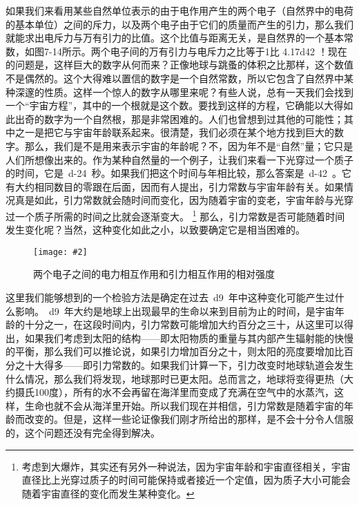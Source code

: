 \documentclass[12pt,oneside]{book}
\providecommand{\numb}[1]{{~\num{#1}~}}
\newenvironment{linefig}[2][1]
{\begin{figure}[H]
\centering
\texttt{[image: \#2]}}
{\end{figure}}
\begin{document}
如果我们来看用某些自然单位表示的由于电作用产生的两个电子（自然界中的电荷的基本单位）之间的斥力，以及两个电子由于它们的质量而产生的引力，那么我们就能求出电斥力与万有引力的比值。这个比值与距离无关，是自然界的一个基本常数，如图7-14所示。两个电子间的万有引力与电斥力之比等于1比 \num{4.17d42} ！现在的问题是，这样巨大的数字从何而来？正像地球与跳蚤的体积之比那样，这个数值不是偶然的。这个大得难以置信的数字是一个自然常数，所以它包含了自然界中某种深邃的性质。这样一个惊人的数字从哪里来呢？有些人说，总有一天我们会找到一个“宇宙方程”，其中的一个根就是这个数。要找到这样的方程，它确能以大得如此出奇的数字为一个自然根，那是非常困难的。人们也曾想到过其他的可能性；其中之一是把它与宇宙年龄联系起来。很清楚，我们必须在某个地方找到巨大的数字。那么，我们是不是用来表示宇宙的年龄呢？不，因为年不是“自然”量；它只是人们所想像出来的。作为某种自然量的一个例子，让我们来看一下光穿过一个质子的时间，它是\numb{d-24}秒。如果我们把这个时间与\uwave{宇宙年龄}\numb{2d10}年相比较，那么答案是\numb{d-42}。它有大约相同数目的零跟在后面，因而有人提出，引力常数与宇宙年龄有关。如果情况真是如此，引力常数就会随时间而变化，因为随着宇宙的变老，宇宙年龄与光穿过一个质子所需的时间之比就会逐渐变大。
\footnote{考虑到大爆炸，其实还有另外一种说法，因为宇宙年龄和宇宙直径相关，宇宙直径比上光穿过质子的时间可能保持或者接近一个定值，因为质子大小可能会随着宇宙直径的变化而发生某种变化。}
那么，引力常数是否可能随着时间发生变化呢？当然，这种变化如此之小，以致要确定它是相当困难的。
\begin{linefig}{两个电子之间的电力相互作用和引力相互作用的相对强度}
\caption{两个电子之间的电力相互作用和引力相互作用的相对强度}
\label{fig:两个电子之间的电力相互作用和引力相互作用的相对强度}
\end{linefig}

这里我们能够想到的一个检验方法是确定在过去\numb{d9}年中这种变化可能产生过什么影响。\numb{d9}年大约是地球上出现最早的生命以来到目前为止的时间，是宇宙年龄的十分之一，在这段时间内，引力常数可能增加大约百分之三十，从这里可以得出，如果我们考虑到太阳的结构——即太阳物质的重量与其内部产生辐射能的快慢的平衡，那么我们可以推论说，如果引力增加百分之十，则太阳的亮度要增加比百分之十大得多——即引力常数的。如果我们计算一下，引力改变时地球轨道会发生什么情况，那么我们将发现，地球那时已更太阳。总而言之，地球将变得更热（大约摄氏100度），所有的水不会再留在海洋里而变成了充满在空气中的水蒸汽，这样，生命也就不会从海洋里开始。所以我们现在并相信，引力常数是随着宇宙的年龄而改变的。但是，这样一些论证像我们刚才所给出的那样，是不会十分令人信服的，这个问题还没有完全得到解决。
\end{document}
